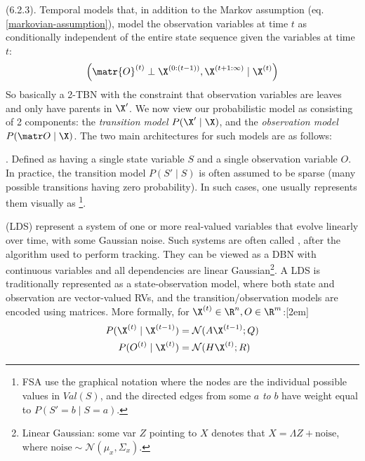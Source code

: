 \documentclass[11pt]{article}
\newcommand\myspace[1][]{\vspace{#1\bigskipamount}}
\newcommand\p{\Needspace{10\baselineskip} \noindent}
\begin{document}
\myspace
\p {} (6.2.3). Temporal models that, in addition to the Markov assumption (eq. \ref{markovian-assumption}), model the observation variables at time $t$ as conditionally independent of the entire state sequence given the variables at time $t$:
\begin{align}
	\left( 
		\matr{O}^{(t)} \perp \X^{(0:(t-1))}, \X^{(t+1:\infty)}
		\mid
		\X^{(t)}
	\right)
\end{align}
So basically a 2-TBN with the constraint that observation variables are leaves and only have parents in $\X'$. We now view our probabilistic model as consisting of 2 components: the \textit{transition model} $P(\X' \mid \X)$, and the \textit{observation model} $P(\matr O \mid \X)$. The two main architectures for such models are as follows:
\begin{compactitem}
	\item {}. Defined as having a single state variable $S$ and a single observation variable $O$. In practice, the transition model $P(S' \mid S)$ is often assumed to be sparse (many possible transitions having zero probability). In such cases, one usually represents them visually as \footnote{FSA use the graphical notation where the nodes are the individual possible values in $Val(S)$, and the directed edges from some $a$ \textit{to} $b$ have weight equal to $P(S'=b \mid S=a)$.}.
	
	\item {} (LDS) represent a system of one or more real-valued variables that evolve linearly over time, with some Gaussian noise. Such systems are often called , after the algorithm used to perform tracking. They can be viewed as a DBN with continuous variables and all dependencies are linear Gaussian\footnote{Linear Gaussian: some var $Z$ pointing to $X$ denotes that $X = \Lambda Z + \text{noise}$, where $\text{noise} \sim \mathcal{N}(\mu_x, \Sigma_x)$.}. A LDS is traditionally represented as a state-observation model, where both state and observation are vector-valued RVs, and the transition/observation models are encoded using matrices. More formally, for $\X^{(t)} \in \R^n, O \in \R^m$:[2em]
	\begin{align}
		P(\X^{(t)} \mid \X^{(t-1)})
			&= \mathcal{N}(A \X^{(t-1)}; Q) \\
		P(O^{(t)} \mid \X^{(t)}) 
			&= \mathcal{N}(H \X^{(t)}; R)
	\end{align}
\end{compactitem}
\end{document}
